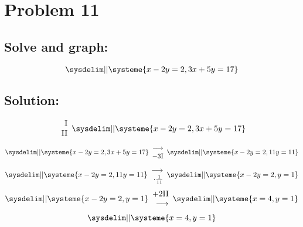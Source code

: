 \documentclass{article}
\begin{document}
\pagebreak

\section*{Problem 11}
\subsection*{Solve and graph:}
\begin{equation}
    \sysdelim||\systeme{
        x - 2y = 2,
        3x + 5y = 17
    }
\end{equation}
\subsection*{Solution:}
\begin{equation}
    \begin{array}{rr}
        $I$\\$II$
    \end{array}
    \sysdelim||\systeme{
        x - 2y = 2,
        3x + 5y = 17
    }
\end{equation}
\begin{equation}
    \sysdelim||\systeme{
        x - 2y = 2,
        3x + 5y = 17
    }
    \begin{array}{rr}
        \longrightarrow
        \\
        -3$I$
    \end{array}
    \sysdelim||\systeme{
        x - 2y = 2,
        11y = 11
    }
\end{equation}
\begin{equation}
    \sysdelim||\systeme{
        x - 2y = 2,
        11y = 11
    }
    \begin{array}{rr}
        \longrightarrow
        \\
        \cdot \frac{1}{11}
    \end{array}
    \sysdelim||\systeme{
        x - 2y = 2,
        y = 1
    }
\end{equation}
\begin{equation}
    \sysdelim||\systeme{
        x - 2y = 2,
        y = 1
    }
    \begin{array}{rr}
        +2$II$
        \\
        \longrightarrow
    \end{array}
    \sysdelim||\systeme{
        x = 4,
        y = 1
    }
\end{equation}
\begin{equation}
    \sysdelim||\systeme{
        x = 4,
        y = 1
    }
\end{equation}
\end{document}
